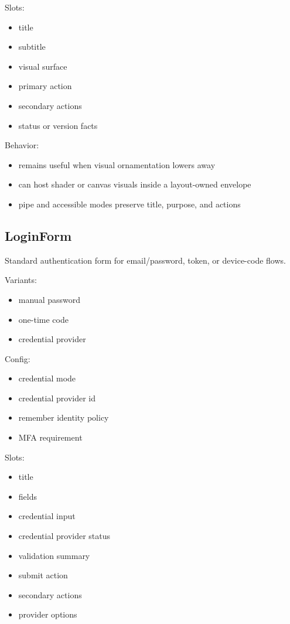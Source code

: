 Slots:

\begin{itemize}
\tightlist
\item
  title
\item
  subtitle
\item
  visual surface
\item
  primary action
\item
  secondary actions
\item
  status or version facts
\end{itemize}

Behavior:

\begin{itemize}
\tightlist
\item
  remains useful when visual ornamentation lowers away
\item
  can host shader or canvas visuals inside a layout-owned envelope
\item
  pipe and accessible modes preserve title, purpose, and actions
\end{itemize}

\subsection{LoginForm}\label{record-128-loginform}

Standard authentication form for email/password, token, or device-code flows.

Variants:

\begin{itemize}
\tightlist
\item
  manual password
\item
  one-time code
\item
  credential provider
\end{itemize}

Config:

\begin{itemize}
\tightlist
\item
  credential mode
\item
  credential provider id
\item
  remember identity policy
\item
  MFA requirement
\end{itemize}

Slots:

\begin{itemize}
\tightlist
\item
  title
\item
  fields
\item
  credential input
\item
  credential provider status
\item
  validation summary
\item
  submit action
\item
  secondary actions
\item
  provider options
\end{itemize}

